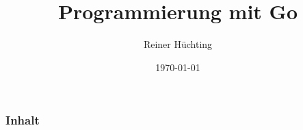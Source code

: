 \beamertemplatenavigationsymbolsempty

\usepackage{distdocs}
\usepackage{src2listings}

\usepackage{amsmath}
\usepackage[ngerman]{babel}
\usepackage{hyperref}
\usepackage{import}
\usepackage{tabularx}
\usepackage{tcolorbox}



\title{Programmierung mit Go}
\author{Reiner Hüchting}
\date{\today}


    \maketitle
    \begin{fframe}
        \frametitle{Inhalt}
        \tableofcontents
    \end{fframe}



